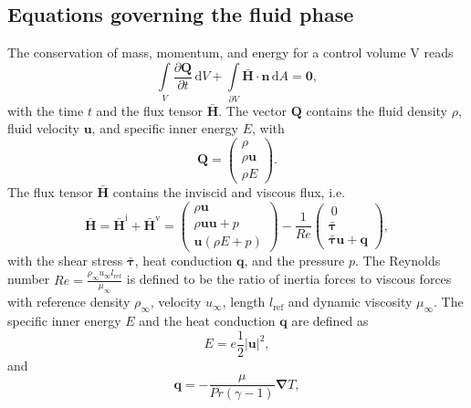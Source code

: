 \documentclass[11pt,a4paper,openany,oneside,parskip=half*]{article}
\renewcommand*\vec[1]{\boldsymbol{#1}}
\renewcommand*\matrix[1]{\boldsymbol{#1}}
\begin{document}
\subsection{Equations governing the fluid phase}
The conservation of mass, momentum, and energy for a control volume V reads
\begin{equation} \label{NavierStokes}
  \int\limits_V \frac{\partial{\vec{Q}}}{\partial{t}} \, \mathrm{d} V+ \int\limits_{\partial{V}} \vec{\bar{H}} \cdot \vec{n} \, \mathrm{d} A = \vec0,
\end{equation}
with the time $t$ and the flux tensor $ \vec{\bar{H}} $.
The vector $ \vec{Q} $ contains the fluid density $ \rho $, 
fluid velocity $ \vec{u} $, and specific inner energy $ E $, with 
\begin{equation}
 \vec{Q}= \left( \begin{array}{c}\rho\\\rho \vec{u}\\\rho E \end{array} \right).
\end{equation}
The flux tensor $\vec{\bar{H}} $ contains the inviscid and viscous flux, i.e.
\begin{equation} 
\vec{\bar{H}} = \vec{\bar{H}^\mathrm{i}} + \vec{\bar{H}^\mathrm{v}} = 
 \left( \begin{array}{c}\rho \vec{u}\\\rho \vec{u} \vec{u} + p\\\vec{u} (\rho E + p) \end{array} \right) - 
 \frac{1}{Re} \left( \begin{array}{c}\ 0 \\ \matrix{\bar{\tau}}\\ \matrix{\bar{\tau}} \vec{u} + \vec{q} \end{array} \right),
\end{equation} 
with the shear stress $\matrix{\bar{\tau}}$, heat conduction $\vec{q}$, and the pressure $p$. The Reynolds number 
$ Re = \frac{\rho_\infty u_\infty l_\mathrm{ref}}{\mu_\infty} $ is defined to be the ratio of inertia forces to viscous forces with reference density $\rho_\infty$, velocity $u_\infty$, length $l_\mathrm{ref}$ and dynamic viscosity $\mu_\infty$. 
\newline
The specific inner energy $ E $ 
and the heat conduction $ \vec{q}$ are defined as
\begin{equation}
 E = e  \frac{1}{2} \vec{|u|}^2,
\end{equation}
and
\begin{equation}
 \vec{q} = - \frac{\mu}{Pr (\gamma - 1)} \vec\nabla T,
\end{equation}
\end{document}
